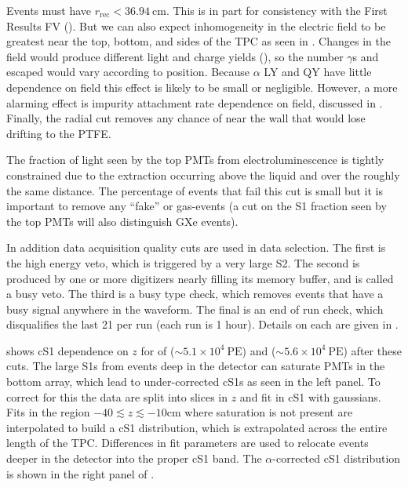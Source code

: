 Events must have $r_{\mathrm{rec}} < 36.94\ \mathrm{cm}$.  This is in part for consistency with the First Results FV
().  But we can also expect inhomogeneity in the electric field to be greatest near the top, bottom, and sides of the
TPC as seen in .  Changes in the field would produce different light and charge yields
(), so the number $\gamma$s and escaped \electron would vary according to position.  Because $\alpha$
LY and QY have little dependence on field this effect is likely to be small or negligible.  However, a more alarming effect is impurity
attachment rate dependence on field, discussed in .  Finally, the radial cut removes any
chance of \alphadecays near the wall that would lose drifting \electron to the PTFE.

The fraction of light seen by the top PMTs from electroluminescence is tightly constrained due to the extraction occurring above the
liquid and over the roughly the same distance.  The percentage of events that fail this cut is small but it is important to remove any
``fake'' or gas-events (a cut on the S1 fraction seen by the top PMTs will also distinguish GXe events).

In addition data acquisition quality cuts are used in data selection.  The first is the high energy veto, which is triggered by a very
large S2.  The second is produced by one or more digitizers nearly filling its memory buffer, and is called a busy veto.  The third is
a busy type check, which removes events that have a busy signal anywhere in the waveform.  The final is an end of run check, which
disqualifies the last 21 per run (each run is 1 hour).  Details on each are given in .

 shows cS1 dependence on $z$ for \alphadecays of 
(${\sim} 5.1 \times 10^4 \ \mathrm{PE}$) and  (${\sim} 5.6 \times 10^4\ \mathrm{PE}$) after these cuts.  The large
S1s from events deep in the detector can saturate PMTs in the bottom array, which lead to under-corrected cS1s as seen in the left
panel.  To correct for this the data are split into slices in $z$ and fit in cS1 with gaussians.  Fits in the region
$-40 \lesssim z \lesssim -10 \mathrm{cm}$ where saturation is not present are interpolated to build a cS1 distribution, which is
extrapolated across the entire length of
the TPC.  Differences in fit parameters are used to relocate events deeper in the detector into the proper cS1 band.  The
$\alpha$-corrected cS1 distribution is shown in the right panel of .

